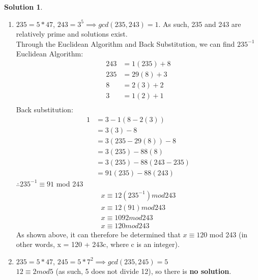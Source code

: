 \documentclass{article}
\theoremstyle{definition}
\newtheorem*{solution}{Solution}
\begin{document}
\begin{solution}
\begin{enumerate}[label = \alph*)]
    \item
    $235 = 5*47$, $243 = 3^5 \implies gcd(235,243)=1$. As such, 235 and 243 are relatively prime and solutions exist.\\
    Through the Euclidean Algorithm and Back Substitution, we can find $235^{-1}$\\
    Euclidean Algorithm:
    \begin{align*}
        243&=1(235)+8\\
        235&=29(8) + 3\\
        8&=2(3)+2\\
        3&=1(2)+1\\
    \end{align*}
    Back substitution:
    \begin{align*}
        1&=3-1(8-2(3))\\
        &=3(3)-8\\
        &=3(235-29(8))-8\\
        &=3(235)-88(8)\\
        &=3(235)-88(243-235)\\
        &=91(235)-88(243)
    \end{align*}
    $\therefore 235^{-1} \equiv 91$ mod 243
    \begin{align*}
        x\equiv 12(235^{-1}) mod 243\\
        x\equiv 12(91) mod 243\\
        x\equiv 1092 mod 243\\
        x\equiv 120 mod 243
    \end{align*}
    As shown above, it can therefore be determined that $x\equiv 120$ mod 243 (in other words, x = 120 + 243c, where c is an integer).
    
    \item
    $235 = 5 * 47$, $245 = 5* 7^2 \implies gcd(235,245) = 5$\\
    $12\equiv 2 mod 5$ (as such, 5 does not divide 12), so there is \textbf{no solution}.
    

\end{enumerate}
\end{solution}
\end{document}
